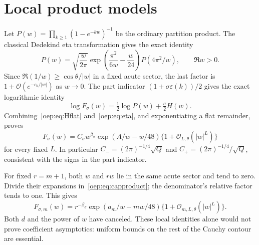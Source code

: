 \documentclass[11pt,letterpaper]{article}
\theoremstyle{remark}\newtheorem{remark}[theorem]{Remark}
\newcommand{\eps}{\varepsilon}
\newcommand{\OO}{\mathcal O}
\begin{document}
\section{Local product models}
Let $P(w)=\prod_{k\geq1}(1-e^{-kw})^{-1}$ be the ordinary partition product. The classical Dedekind eta transformation \cite{eta} gives the exact identity
\begin{equation}\label{oep:eq:eta}
 P(w)=\sqrt{\frac w{2\pi}}\exp\!\left(\frac{\pi^2}{6w}-\frac w{24}\right)
                       P(4\pi^2/w),\qquad\Re w>0.
\end{equation}
Since $\Re(1/w)\geq\cos\theta/|w|$ in a fixed acute sector, the last factor is $1+\OO(e^{-c_\theta/|w|})$ as $w\to0$. The part indicator $(1+\sigma\eps(k))/2$ gives the exact logarithmic identity
\[
 \log F_\sigma(w)=\tfrac12\log P(w)+\tfrac\sigma2 H(w).
\]
Combining~\eqref{oep:eq:Hflat} and~\eqref{oep:eq:eta}, and exponentiating a flat remainder, proves
\begin{equation}\label{oep:eq:localunrestricted}
 F_\sigma(w)=C_\sigma w^{\beta_\sigma}
               \exp(A/w-w/48)\{1+\OO_{L,\theta}(|w|^L)\}
\end{equation}
for every fixed $L$. In particular $C_-=(2\pi)^{-1/4}\sqrt Q$ and $C_+=(2\pi)^{-1/4}/\sqrt Q$, consistent with the signs in the part indicator.

For fixed $r=m+1$, both $w$ and $rw$ lie in the same acute sector and tend to zero. Divide their expansions in~\eqref{oep:eq:capproduct}; the denominator's relative factor tends to one. This gives
\begin{equation}\label{oep:eq:localcapped}
 F_{\sigma,m}(w)=r^{-\beta_\sigma}
       \exp(a_m/w+mw/48)\{1+\OO_{m,L,\theta}(|w|^L)\}.
\end{equation}
Both $d$ and the power of $w$ have canceled. These local identities alone would not prove coefficient asymptotics: uniform bounds on the rest of the Cauchy contour are essential.
\end{document}
